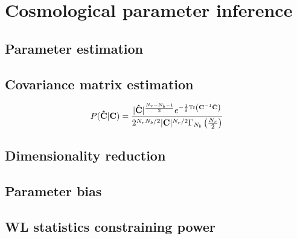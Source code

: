 
\chapter{Cosmological parameter inference}
\lhead[\fancyplain{}{\thepage}]{\fancyplain{}{\rightmark}}
 \thispagestyle{plain}
\setlength{\parindent}{10mm}


\section{Parameter estimation}

\section{Covariance matrix estimation}

\begin{equation}
\label{eq:5:wishart-pdf}
P(\mathbf{\hat{C}}\vert \mathbf{C}) = \frac{\vert\mathbf{\hat{C}}\vert^{\frac{N_r-N_b-1}{2}}e^{-\frac{1}{2}{\rm Tr}\left(\mathbf{C}^{-1}\mathbf{\hat{C}}\right)}}{2^{N_rN_b/2}\vert \mathbf{C}\vert^{N_r/2}\Gamma_{N_b}\left(\frac{N_r}{2}\right)}
\end{equation}

\section{Dimensionality reduction}

\section{Parameter bias}

\section{WL statistics constraining power}

%